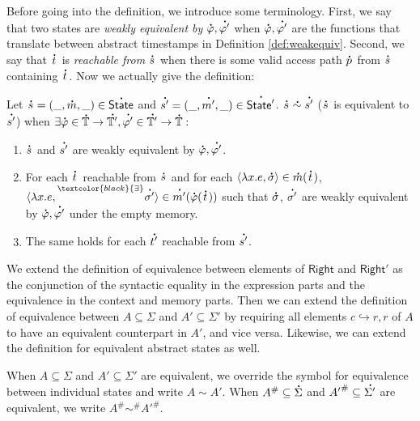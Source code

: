 \documentclass[acmsmall,screen,review]{acmart}\settopmatter{printfolios=true,printccs=false,printacmref=false}
\newcommand*{\prexists}[2][black]{\prescript{\textcolor{#1}{\exists}}{}{#2}}
\newcommand*{\A}[1]{\overset{\,_{\mbox{\Large .}}}{#1}}
\newcommand*{\Abs}[1]{{#1}^{\#}}
\newcommand*{\Time}{\mathbb{T}}
\newcommand*{\ATime}{\A{\Time}}
\newcommand*{\ctx}{\sigma}
\newcommand*{\mem}{m}
\newcommand*{\config}{c}
\newcommand*{\Right}{\mathsf{Right}}
\newcommand*{\rightst}{r}
\newcommand*{\State}{\mathsf{State}}
\newcommand*{\AState}{\A{\mathsf{State}}}
\newcommand*{\semarrow}{\hookrightarrow}
\newcommand*{\equivalent}{\sim}
\begin{document}
Before going into the definition, we introduce some terminology.
First, we say that two states are \emph{weakly equivalent by} $\A\varphi,\A{\varphi'}$ when $\A\varphi,\A{\varphi'}$ are the functions that translate between abstract timestamps in Definition \ref{def:weakequiv}.
Second, we say that $\A{t}$ is \emph{reachable from} $\A{s}$ when there is some valid access path $\A{p}$ from $\A{s}$ containing $\A{t}$.
Now we actually give the definition:
\begin{definition}
  Let $\A{s}=(\_,\A\mem,\_)\in\AState$ and $\A{s'}=(\_,\A{\mem'},\_)\in\A{\State'}$.
  $\A{s}\A\equivalent\A{s'}$ ($\A{s}$ is equivalent to $\A{s'}$) when $\exists\A\varphi\in\ATime\rightarrow\A{\Time'},\A{\varphi'}\in\A{\Time'}\rightarrow\ATime:$
  \begin{enumerate}
    \item $\A{s}$ and $\A{s'}$ are weakly equivalent by $\A\varphi,\A{\varphi'}$.
    \item For each $\A{t}$ reachable from $\A{s}$ and for each $\langle\lambda x.e,\A{\ctx}\rangle\in\A\mem(\A{t})$, $\langle\lambda x.e,\prexists{\A{\ctx'}}\rangle\in\A{\mem'}(\A\varphi(\A{t}))$ such that $\A{\ctx}$, $\A{\ctx'}$ are weakly equivalent by $\A\varphi,\A{\varphi'}$ under the empty memory.
    \item The same holds for each $\A{t'}$ reachable from $\A{s'}$.
  \end{enumerate}
\end{definition}

We extend the definition of equivalence between elements of $\Right$ and $\Right'$ as the conjunction of the syntactic equality in the expression parts and the equivalence in the context and memory parts.
Then we can extend the definition of equivalence between $A\subseteq\Sigma$ and $A'\subseteq\Sigma'$ by requiring all elements $\config\semarrow\rightst,\rightst$ of $A$ to have an equivalent counterpart in $A'$, and vice versa.
Likewise, we can extend the definition for equivalent abstract states as well.

When $A\subseteq\Sigma$ and $A'\subseteq\Sigma'$ are equivalent, we override the symbol for equivalence between individual states and write $A\equivalent A'$.
When $\Abs{A}\subseteq\A{\Sigma}$ and $\Abs{A'}\subseteq\A{\Sigma'}$ are equivalent, we write $\Abs{A}\Abs\equivalent\Abs{A'}$.
\end{document}
